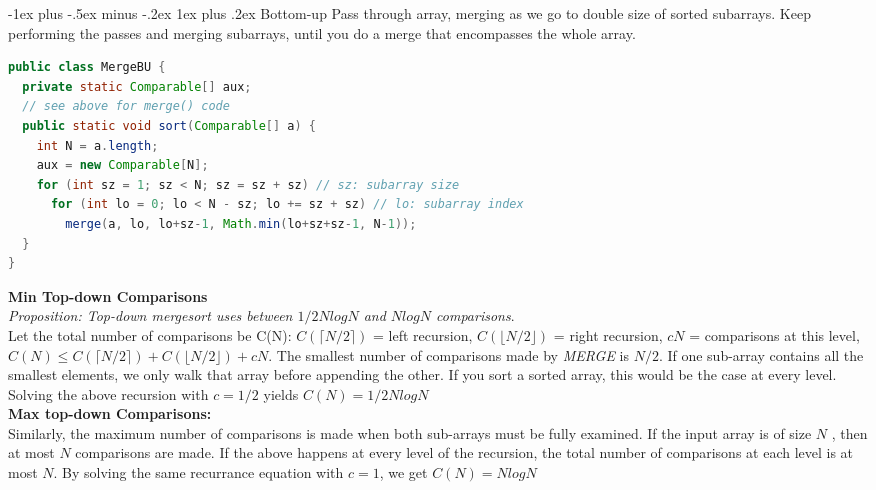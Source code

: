 \documentclass[letterpaper, 8pt]{extarticle}
\makeatletter
\renewcommand{\subsubsection}{\@startsection{subsubsection}{3}{0mm}%
                                {-1ex plus -.5ex minus -.2ex}%
                                {1ex plus .2ex}%
                                {\normalfont\tiny\bfseries}}
\makeatother
\begin{document}
\begin{multicols*}{4}
  \subsubsection{Bottom-up}
  Pass through array, merging as we go to double size of sorted subarrays. Keep performing the passes and merging subarrays, until you do a merge that encompasses the whole array.\\
  \begin{lstlisting}[language=Java, breaklines=true, postbreak=\mbox{\textcolor{red}{$\hookrightarrow$}\space}]
public class MergeBU {
  private static Comparable[] aux;
  // see above for merge() code
  public static void sort(Comparable[] a) {
    int N = a.length;
    aux = new Comparable[N];
    for (int sz = 1; sz < N; sz = sz + sz) // sz: subarray size
      for (int lo = 0; lo < N - sz; lo += sz + sz) // lo: subarray index
        merge(a, lo, lo+sz-1, Math.min(lo+sz+sz-1, N-1));
  }
}
  \end{lstlisting}


  \textbf{Min Top-down Comparisons}\\
  \textit{Proposition: Top-down mergesort uses between $1/2N log N$ and $N log N$ comparisons}.\\
  Let the total number of comparisons be C(N): $C(\lceil N/2 \rceil)$ = left recursion, $C(\lfloor N/2 \rfloor)$ = right recursion, $cN$ = comparisons at this level, $C (N) \leq C(\lceil N/2 \rceil) + C(\lfloor N / 2 \rfloor ) + cN$. The smallest number of comparisons made by \textit{MERGE} is $N/2$. If one sub-array contains all the smallest elements, we only walk that array before appending the other. If you sort a sorted array, this would be the case at every level. Solving the above recursion with $c = 1/2$ yields $C(N) = 1/2 N log N$\\
  \textbf{Max top-down Comparisons:}\\
  Similarly, the maximum number of comparisons is made when both sub-arrays must be fully examined. If the input array is of size $N$ , then at most $N$ comparisons are made. If the above happens at every level of the recursion, the total number of comparisons at each level is at most $N$. By solving the same recurrance equation with $c = 1$, we get $C(N ) = N log N$\\


\end{multicols*}
\end{document}
